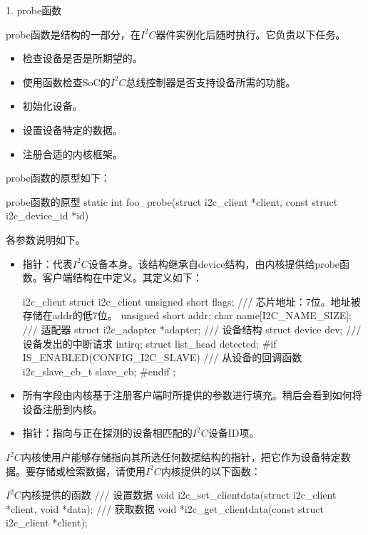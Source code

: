 \documentclass[lang=cn,newtx,10pt,scheme=chinese]{elegantbook}
\begin{document}
1. probe函数

probe函数是结构的一部分，在$I^2C$器件实例化后随时执行。它负责以下任务。

\begin{itemize}
    \item 检查设备是否是所期望的。
    \item 使用函数检查SoC的$I^2C$总线控制器是否支持设备所需的功能。
    \item 初始化设备。
    \item 设置设备特定的数据。
    \item 注册合适的内核框架。
\end{itemize}

probe函数的原型如下：

\begin{mycode}{probe函数的原型}
static int foo_probe(struct i2c_client *client, const struct i2c_device_id *id)
\end{mycode}

各参数说明如下。

\begin{itemize}
    \item {}指针：代表$I^2C$设备本身。该结构继承自device结构，由内核提供给probe函数。客户端结构在中定义。其定义如下：
\begin{mycode}{i2c\_client}
struct i2c_client {
    unsigned short flags;
    /// 芯片地址：7位。地址被存储在addr的低7位。
    unsigned short addr;
    char name[I2C_NAME_SIZE];
    /// 适配器
    struct i2c_adapter *adapter;
    /// 设备结构
    struct device dev;
    /// 设备发出的中断请求
    intirq;
    struct list_head detected;
#if IS_ENABLED(CONFIG_I2C_SLAVE)
    /// 从设备的回调函数
    i2c_slave_cb_t slave_cb;
#endif
};
\end{mycode}
    \item 所有字段由内核基于注册客户端时所提供的参数进行填充。稍后会看到如何将设备注册到内核。
    \item {}指针：指向与正在探测的设备相匹配的$I^2C$设备ID项。
\end{itemize}

$I^2C$内核使用户能够存储指向其所选任何数据结构的指针，把它作为设备特定数据。要存储或检索数据，请使用$I^2C$内核提供的以下函数：

\begin{mycode}{$I^2C$内核提供的函数}
/// 设置数据
void i2c_set_clientdata(struct i2c_client *client, void *data);
/// 获取数据
void *i2c_get_clientdata(const struct i2c_client *client);
\end{mycode}
\end{document}
